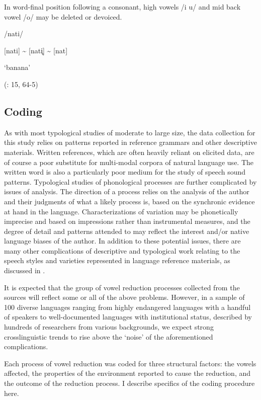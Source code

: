\ea\label{ex:(6.13)}

In word-final position following a consonant, high vowels /i u/ and mid back vowel /o/ may be deleted or devoiced.

/nati/

[nati] {\textasciitilde} [nati̥] {\textasciitilde} [nat]

\glt ‘banana’

(\citealt{Lacrampe2014}: 15, 64-5)

\z

\subsection{Coding}\label{sec:6.2.3}

  As with most typological studies of moderate to large size, the data collection for this study relies on patterns reported in reference grammars and other descriptive materials. Written references, which are often heavily reliant on elicited data, are of course a poor substitute for multi-modal corpora of natural language use. The written word is also a particularly poor medium for the study of speech sound patterns. Typological studies of phonological processes are further complicated by issues of analysis. The direction of a process relies on the analysis of the author and their judgments of what a likely process is, based on the synchronic evidence at hand in the language. Characterizations of variation may be phonetically imprecise and based on impressions rather than instrumental measures, and the degree of detail and patterns attended to may reflect the interest and/or native language biases of the author. In addition to these potential issues, there are many other complications of descriptive and typological work relating to the speech styles and varieties represented in language reference materials, as discussed in .

  It is expected that the group of vowel reduction processes collected from the sources will reflect some or all of the above problems. However, in a sample of 100 diverse languages ranging from highly endangered languages with a handful of speakers to well-documented languages with institutional status, described by hundreds of researchers from various backgrounds, we expect strong crosslinguistic trends to rise above the ‘noise’ of the aforementioned complications.

  Each process of vowel reduction was coded for three structural factors: the vowels affected, the properties of the environment reported to cause the reduction, and the outcome of the reduction process. I describe specifics of the coding procedure here.

